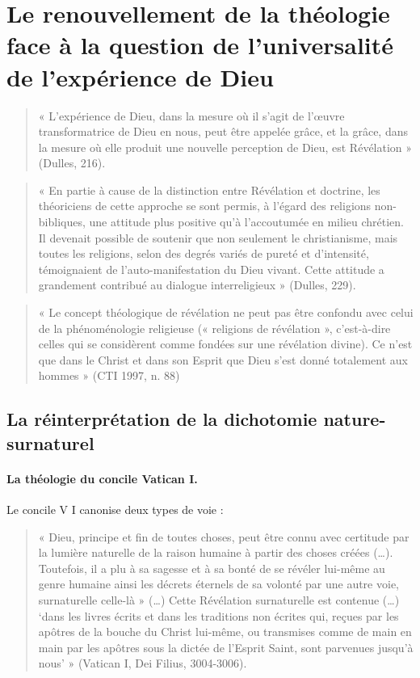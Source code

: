 \section{Le renouvellement de la théologie face à la question de l’universalité de l’expérience de Dieu}

\begin{quote}
    « L’expérience de Dieu, dans la mesure où il s’agit de l’œuvre transformatrice de Dieu en nous, peut être appelée grâce, et la grâce, dans la mesure où elle produit une nouvelle perception de Dieu, est Révélation » (Dulles, 216). 
\end{quote}
\begin{quote}
    « En partie à cause de la distinction entre Révélation et doctrine, les théoriciens de cette approche se sont permis, à l’égard des religions non-bibliques, une attitude plus positive qu’à l’accoutumée en milieu chrétien. Il devenait possible de soutenir que non seulement le christianisme, mais toutes les religions, selon des degrés variés de pureté et d’intensité, témoignaient de l’auto-manifestation du Dieu vivant. Cette attitude a grandement contribué au dialogue interreligieux » (Dulles, 229). 
\end{quote}
\begin{quote}
    « Le concept théologique de révélation ne peut pas être confondu avec celui de la phénoménologie religieuse (« religions de révélation », c’est-à-dire celles qui se considèrent comme fondées sur une révélation divine). Ce n’est que dans le Christ et dans son Esprit que Dieu s’est donné totalement aux hommes » (CTI 1997, n. 88) 
\end{quote} 


\subsection{La réinterprétation de la dichotomie nature-surnaturel}
 

\paragraph{ La théologie du concile Vatican I. }

Le concile V I canonise deux types de voie : 
\begin{quote}
    « Dieu, principe et fin de toutes choses, peut être connu avec certitude par la lumière naturelle de la raison humaine à partir des choses créées (…). Toutefois, il a plu à sa sagesse et à sa bonté de se révéler lui-même au genre humaine ainsi les décrets éternels de sa volonté par une autre voie, surnaturelle celle-là » (…) Cette Révélation surnaturelle est contenue (…) ‘dans les livres écrits et dans les traditions non écrites qui, reçues par les apôtres de la bouche du Christ lui-même, ou transmises comme de main en main par les apôtres sous la dictée de l’Esprit Saint, sont parvenues jusqu’à nous’ » (Vatican I, Dei Filius, 3004-3006).
\end{quote}





